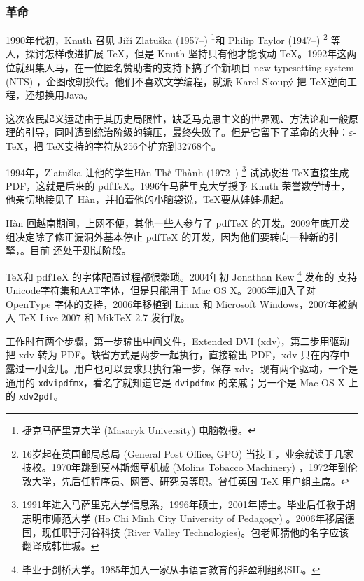 \subsubsection{革命}

1990年代初，Knuth 召见 Jiří Zlatuška (1957--)\indexZlatuska{} \footnote{捷克马萨里克大学 (Masaryk University) 电脑教授。}和 Philip Taylor (1947--)\indexTaylor{} \footnote{16岁起在英国邮局总局 (General Post Office, GPO) 当技工，业余就读于几家技校。1970年跳到莫林斯烟草机械 (Molins Tobacco Machinery) ，1972年到伦敦大学，先后任程序员、网管、研究员等职。曾任英国 TeX 用户组主席。} 等人，探讨怎样改进扩展 \TeX ，但是 Knuth 坚持只有他才能改动 \TeX。1992年这两位就纠集人马，在一位匿名赞助者的支持下搞了个新项目 new typesetting system (NTS) ，企图改朝换代。他们不喜欢文学编程，就派 Karel Skoupý 把 \TeX 逆向工程，还想换用Java。

这次农民起义运动由于其历史局限性，缺乏马克思主义的世界观、方法论和一般原理的引导，同时遭到统治阶级的镇压，最终失败了。但是它留下了革命的火种：$\varepsilon$-\TeX ，把 \TeX 支持的字符从256个扩充到32768个。

1994年，Zlatuška 让他的学生{\lmr Hàn Thế Thành} (1972--)\indexHan{} \footnote{1991年进入马萨里克大学信息系，1996年硕士，2001年博士。毕业后任教于胡志明市师范大学 (Ho Chi Minh City University of Pedagogy) 。2006年移居德国，现任职于河谷科技 (River Valley Technologies)。包老师猜他的名字应该翻译成韩世城。} 试试改进 \TeX 直接生成 PDF，这就是后来的 pdfTeX。1996年马萨里克大学授予 Knuth 荣誉数学博士，他亲切地接见了 Hàn，并拍着他的小脑袋说，\TeX 要从娃娃抓起。

Hàn 回越南期间，上网不便，其他一些人参与了 pdfTeX 的开发。2009年底开发组决定除了修正漏洞外基本停止 pdfTeX 的开发，因为他们要转向一种新的引擎，\LuaTeX。目前 \LuaTeX 还处于测试阶段。

\TeX 和 pdfTeX 的字体配置过程都很繁琐。2004年初 Jonathan Kew\indexKew{} \footnote{毕业于剑桥大学。1985年加入一家从事语言教育的非盈利组织SIL\indexSIL。} 发布的 \XeTeX 支持Unicode字符集和AAT字体，但是只能用于 Mac OS X。2005年加入了对 OpenType 字体的支持，2006年移植到 Linux 和 Microsoft Windows，2007年被纳入 TeX Live 2007 和 MikTeX 2.7 发行版。

\XeTeX 工作时有两个步骤，第一步输出中间文件，Extended DVI (xdv)，第二步用驱动把 xdv 转为 PDF。缺省方式是两步一起执行，直接输出 PDF，xdv 只在内存中露过一小脸儿。用户也可以要求只执行第一步，保存 xdv。\XeTeX 现有两个驱动，一个是通用的 \texttt{xdvipdfmx}，看名字就知道它是 \texttt{dvipdfmx} 的亲戚；另一个是 Mac OS X 上的 \texttt{xdv2pdf}。

